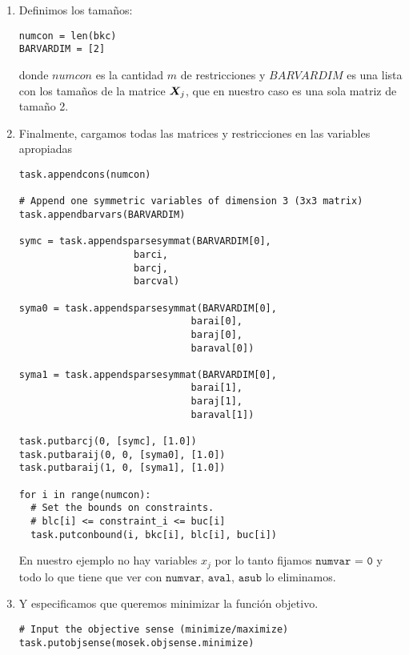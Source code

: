 \documentclass[11pt]{article}
\begin{document}
\begin{enumerate}
\item Definimos los tamaños:
\begin{lstlisting}
numcon = len(bkc)
BARVARDIM = [2]
\end{lstlisting}
donde $numcon$ es la cantidad $m$ de restricciones y $BARVARDIM$ es una lista con los tamaños de la matrice $\bm{X}_j$, que en nuestro caso es una sola matriz de tamaño 2.

\item Finalmente, cargamos todas las matrices y restricciones en las variables apropiadas

\begin{lstlisting}
task.appendcons(numcon)

# Append one symmetric variables of dimension 3 (3x3 matrix)
task.appendbarvars(BARVARDIM)

symc = task.appendsparsesymmat(BARVARDIM[0],
                    barci,
                    barcj,
                    barcval)
                    
syma0 = task.appendsparsesymmat(BARVARDIM[0],
                              barai[0],
                              baraj[0],
                              baraval[0])

syma1 = task.appendsparsesymmat(BARVARDIM[0],
                              barai[1],
                              baraj[1],
                              baraval[1])

task.putbarcj(0, [symc], [1.0])
task.putbaraij(0, 0, [syma0], [1.0])
task.putbaraij(1, 0, [syma1], [1.0])

for i in range(numcon):
  # Set the bounds on constraints.
  # blc[i] <= constraint_i <= buc[i]
  task.putconbound(i, bkc[i], blc[i], buc[i])
\end{lstlisting}

En nuestro ejemplo no hay variables $x_j$ por lo tanto fijamos $\texttt{numvar = 0}$ y todo lo que tiene que ver con $\texttt{numvar}$, $\texttt{aval}$, $\texttt{asub}$ lo eliminamos.

\item Y especificamos que queremos minimizar la función objetivo.

\begin{lstlisting}
# Input the objective sense (minimize/maximize)
task.putobjsense(mosek.objsense.minimize)
\end{lstlisting}

\end{enumerate}
\end{document}
